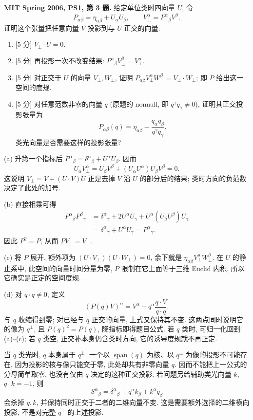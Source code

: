 \begin{exercise}
\textbf{MIT Spring 2006, PS1, 第 3 题.} 给定单位类时四向量 $U$, 令
\[
 P_{\alpha\beta}=\eta_{\alpha\beta}+U_\alpha U_\beta,
 \qquad V_\perp^\alpha=P^\alpha{}_{\beta}V^\beta.
\]
证明这个张量把任意向量 $V$ 投影到与 $U$ 正交的向量:
\begin{enumerate}[label=(\alph*)]
\item \textnormal{[5 分]} $V_\perp\cdot U=0$.
\item \textnormal{[5 分]} 再投影一次不改变结果: $P^\alpha{}_{\beta}V_\perp^\beta=V_\perp^\alpha$.
\item \textnormal{[5 分]} 对正交于 $U$ 的向量 $V_\perp,W_\perp$, 证明
 $P_{\alpha\beta}V_\perp^\alpha W_\perp^\beta=V_\perp\cdot W_\perp$; 即 $P$ 给出这一空间的度规.
\item \textnormal{[5 分]} 对任意范数非零的向量 $q$ (原题的 nonnull, 即 $q^\gamma q_\gamma\ne0$), 证明其正交投影张量为
\[
 P_{\alpha\beta}(q)=\eta_{\alpha\beta}
 -\frac{q_\alpha q_\beta}{q^\gamma q_\gamma}.
\]
类光向量是否需要这样的投影张量?
\end{enumerate}
\end{exercise}
\begin{solution}
(a) 升第一个指标后 $P^\alpha{}_{\beta}=\delta^\alpha{}_{\beta}+U^\alpha U_\beta$. 因而
\[
 U_\alpha V_\perp^\alpha=U_\beta V^\beta
 +(U_\alpha U^\alpha)U_\beta V^\beta=0.
\]
这说明 $V_\perp=V+(U\cdot V)U$ 正是去掉 $V$ 沿 $U$ 的部分后的结果; 类时方向的负范数决定了此处的加号.

(b) 直接相乘可得
\begin{equation*}
\begin{aligned}
 P^\alpha{}_{\beta}P^\beta{}_{\gamma}
 &=\delta^\alpha{}_{\gamma}+2U^\alpha U_\gamma
    +U^\alpha(U_\beta U^\beta)U_\gamma\\
 &=\delta^\alpha{}_{\gamma}+U^\alpha U_\gamma=P^\alpha{}_{\gamma}.
\end{aligned}
\end{equation*}
因此 $P^2=P$, 从而 $PV_\perp=V_\perp$.

(c) 将 $P$ 展开, 额外项为 $(U\cdot V_\perp)(U\cdot W_\perp)=0$, 余下就是 $\eta_{\alpha\beta}V_\perp^\alpha W_\perp^\beta$. 在 $U$ 的静止系中, 此空间的向量时间分量为零, $P$ 限制在它上面等于三维 Euclid 内积, 所以它确实是正定的空间度规.

(d) 对 $q\cdot q\ne0$, 定义
\[
 (P(q)V)^\alpha=V^\alpha-q^\alpha\frac{q\cdot V}{q\cdot q}.
\]
与 $q$ 收缩得到零; 对已经与 $q$ 正交的向量, 上式又保持其不变. 这两点同时说明它的像为 $q^\perp$, 且 $P(q)^2=P(q)$, 降指标即得题目公式. 若 $q$ 类时, 可归一化回到 (a)--(c); 若 $q$ 类空, 正交补本身仍含类时方向, 它的诱导度规就不再正定.

当 $q$ 类光时, $q$ 本身属于 $q^\perp$. 一个以 $\operatorname{span}(q)$ 为核、以 $q^\perp$ 为像的投影不可能存在, 因为投影的核与像只能交于零, 此处却共有非零向量 $q$. 因而不能把上一公式的分母简单取零, 也没有仅由 $q$ 决定的这种正交投影. 若问题另给辅助类光向量 $k$, $q\cdot k=-1$, 则
\[
 S^\alpha{}_{\beta}=\delta^\alpha{}_{\beta}
 +q^\alpha k_\beta+k^\alpha q_\beta
\]
会杀掉 $q,k$, 并保持同时正交于二者的二维向量不变. 这是需要额外选择的二维横向投影, 不是对完整 $q^\perp$ 的上述投影.
\end{solution}

